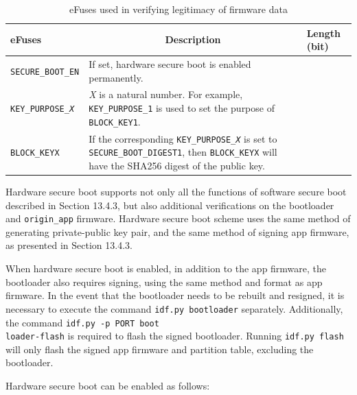 \documentclass[a4paper,12pt,openany]{book}
\renewcommand{\arraystretch}{1}
\begin{document}
\begin{table}[h!]
    \renewcommand{\arraystretch}{1.4}
    \caption{eFuses used in verifying legitimacy of firmware data}
    \begin{tabular}{|>{\Centering}m{9em}|m{23.5em}|>{\Centering}m{6em}|}
        \hline
        \rowcolor{LightBlue} \textbf{eFuses}&\multicolumn{1}{c|}{\textbf{Description}}&\textbf{Length (bit)}\\
        \hline
        \verb|SECURE_BOOT_EN|&If set, hardware secure boot is enabled permanently.&1\\
        \hline
        \texttt{KEY\_PURPOSE\_\textit{X}}&\textit{X} is a natural number. For example, \verb|KEY_PURPOSE_1| is used to set the purpose of \verb|BLOCK_KEY1|.&4\\
        \hline
        \verb|BLOCK_KEYX|&If the corresponding \texttt{KEY\_PURPOSE\_\textit{X}} is set to \verb|SECURE_BOOT_DIGEST1|, then \verb|BLOCK_KEYX| will have the SHA256 digest of the public key.&256\\
        \hline
    \end{tabular}
\end{table}

Hardware secure boot supports not only all the functions of software secure boot described in Section 13.4.3, but also additional verifications on the bootloader and \verb|origin_app| firmware. Hardware secure boot scheme uses the same method of generating private-public key pair, and the same method of signing app firmware, as presented in Section 13.4.3.

When hardware secure boot is enabled, in addition to the app firmware, the bootloader also requires signing, using the same method and format as app firmware. In the event that the bootloader needs to be rebuilt and resigned, it is necessary to execute the command \verb|idf.py bootloader| separately. Additionally, the command \verb|idf.py -p PORT boot|\\ \verb|loader-flash| is required to flash the signed bootloader. Running \verb|idf.py flash| will only flash the signed app firmware and partition table, excluding the bootloader.

Hardware secure boot can be enabled as follows: 
\end{document}
